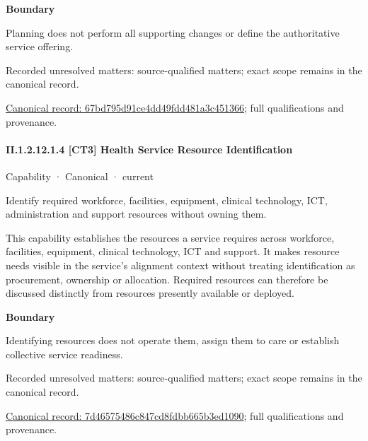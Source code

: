 \textbf{Boundary}



Planning does not perform all supporting changes or define the authoritative service offering.


{\small Recorded unresolved matters: source-qualified matters; exact scope remains in the canonical record.}\par
{\footnotesize \href{../../../../../../../continuum/strategy/capability/67bd795d91ce4dd49fdd481a3c451366.md}{Canonical record: 67bd795d91ce4dd49fdd481a3c451366}; full qualifications and provenance.}\par
\paragraph*{II.1.2.12.1.4 [CT3] Health Service Resource Identification}
\label{navigation:II.1.2.12.1.4}

\label{element:7d46575486c847cd8fdbb665b3ed1090}
{\small Capability · Canonical · current}\par

Identify required workforce, facilities, equipment, clinical technology, ICT, administration and support resources without owning them.



This capability establishes the resources a service requires across workforce, facilities, equipment, clinical technology, ICT and support. It makes resource needs visible in the service's alignment context without treating identification as procurement, ownership or allocation. Required resources can therefore be discussed distinctly from resources presently available or deployed.



\textbf{Boundary}



Identifying resources does not operate them, assign them to care or establish collective service readiness.


{\small Recorded unresolved matters: source-qualified matters; exact scope remains in the canonical record.}\par
{\footnotesize \href{../../../../../../../continuum/strategy/capability/7d46575486c847cd8fdbb665b3ed1090.md}{Canonical record: 7d46575486c847cd8fdbb665b3ed1090}; full qualifications and provenance.}\par
